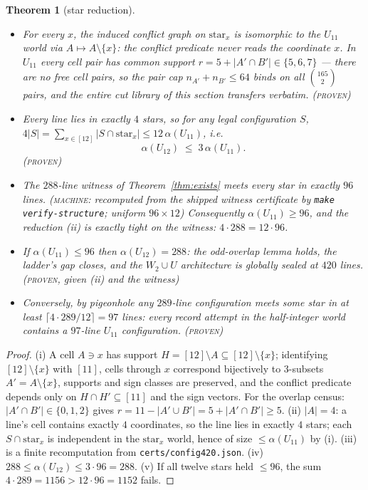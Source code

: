 \documentclass[11pt]{article}
\newtheorem{theorem}{Theorem}
\theoremstyle{remark}
\begin{document}
\begin{theorem}[star reduction]\label{thm:star}
\begin{itemize}
\item[\textup{(i)}] For every $x$, the induced conflict graph on
$\mathrm{star}_x$ is isomorphic to the $U_{11}$ world via
$A\mapsto A\setminus\{x\}$: the conflict predicate never reads the
coordinate $x$. In $U_{11}$ every cell pair has common support
$r=5+|A'\cap B'|\in\{5,6,7\}$ --- there are \emph{no} free cell pairs, so
the pair cap $n_{A'}+n_{B'}\le64$ binds on all
$\binom{165}2$ pairs, and the entire cut library of this section
transfers verbatim. \textsc{(proven)}
\item[\textup{(ii)}] Every line lies in exactly $4$ stars, so for any
legal configuration $S$,
$4|S|=\sum_{x\in[12]}|S\cap\mathrm{star}_x|\le12\,\alpha(U_{11})$, i.e.
\[
\alpha(U_{12})\;\le\;3\,\alpha(U_{11}).
\]
\textsc{(proven)}
\item[\textup{(iii)}] The $288$-line witness of Theorem~\ref{thm:exists}
meets every star in exactly $96$ lines. \textsc{(machine}: recomputed from
the shipped witness certificate by \texttt{make verify-structure};
uniform $96\times12$\textsc{)} Consequently $\alpha(U_{11})\ge96$, and the
reduction (ii) is exactly tight on the witness: $4\cdot288=12\cdot96$.
\item[\textup{(iv)}] If $\alpha(U_{11})\le 96$ then $\alpha(U_{12})=288$:
the odd-overlap lemma holds, the ladder's gap closes, and the
$W_2\cup U$ architecture is globally sealed at $420$ lines.
\textsc{(proven}, given (ii) and the witness\textsc{)}
\item[\textup{(v)}] Conversely, by pigeonhole any $289$-line
configuration meets some star in at least
$\lceil 4\cdot289/12\rceil=97$ lines: \emph{every} record attempt in the
half-integer world contains a $97$-line $U_{11}$ configuration.
\textsc{(proven)}
\end{itemize}
\end{theorem}

\begin{proof}
(i) A cell $A\ni x$ has support $H=[12]\setminus A\subseteq
[12]\setminus\{x\}$; identifying $[12]\setminus\{x\}$ with $[11]$, cells
through $x$ correspond bijectively to $3$-subsets $A'=A\setminus\{x\}$,
supports and sign classes are preserved, and the conflict predicate
depends only on $H\cap H'\subseteq[11]$ and the sign vectors. For the
overlap census: $|A'\cap B'|\in\{0,1,2\}$ gives
$r=11-|A'\cup B'|=5+|A'\cap B'|\ge5$. (ii) $|A|=4$: a line's cell contains
exactly $4$ coordinates, so the line lies in exactly $4$ stars; each
$S\cap\mathrm{star}_x$ is independent in the $\mathrm{star}_x$ world,
hence of size $\le\alpha(U_{11})$ by (i). (iii) is a finite recomputation
from \texttt{certs/config420.json}. (iv) $288\le\alpha(U_{12})
\le3\cdot96=288$. (v) If all twelve stars held $\le96$, the sum
$4\cdot289=1156>12\cdot96=1152$ fails.
\end{proof}
\end{document}
